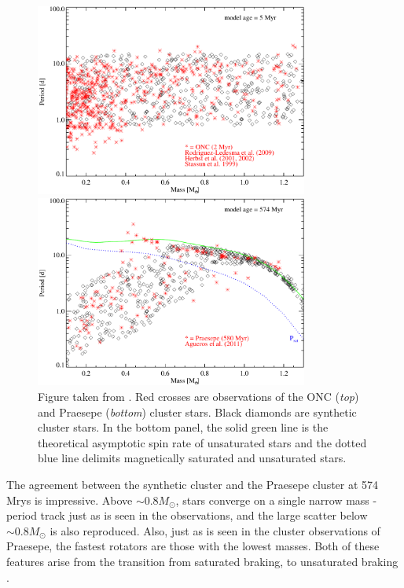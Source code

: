 \begin{figure}[!tbp]
    \centering
    \begin{minipage}[b]{\textwidth}
        \centering
        \includegraphics[width=0.8\textwidth]{figures/introduction/matt_2015_fig2a.pdf}
    \end{minipage}
    \begin{minipage}[b]{\textwidth}
        \centering
        \includegraphics[width=0.8\textwidth]{figures/introduction/matt_2015_fig2b.pdf}
    \end{minipage}
    \caption{Figure taken from \citet{matt2015}. Red crosses are observations of the ONC ({\it top}) and Praesepe ({\it bottom}) cluster stars. Black diamonds are synthetic cluster stars. In the bottom panel, the solid green line is the theoretical asymptotic spin rate of unsaturated stars and the dotted blue line delimits magnetically saturated and unsaturated stars.}
    \label{fig:introduction:Matt 2015 figure 2}
\end{figure}

The agreement between the synthetic cluster and the Praesepe cluster at 574 Mrys is impressive. Above $\sim 0.8 M_\odot$, stars converge on a single narrow mass - period track just as is seen in the observations, and the large scatter below $\sim 0.8 M_\odot$ is also reproduced. Also, just as is seen in the cluster observations of Praesepe, the fastest rotators are those with the lowest masses. Both of these features arise from the transition from saturated braking, to unsaturated braking \citep{matt2015}. 

